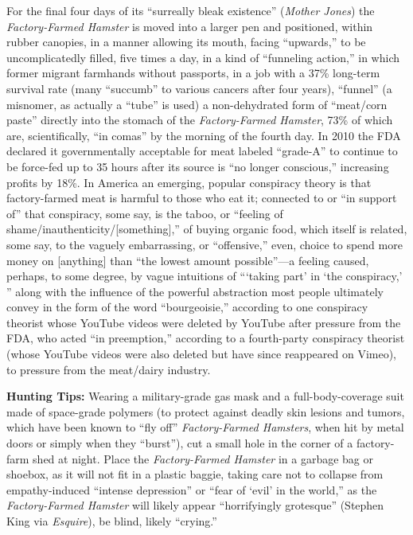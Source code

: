 \documentclass[10pt,twoside,openright]{memoir}
\begin{document}
For the final four days of its ``surreally
bleak existence'' ({\em Mother Jones}) the {\em Factory-Farmed Hamster} is moved
into a larger pen and positioned, within rubber canopies, in a manner allowing
its mouth, facing ``upwards,'' to be uncomplicatedly filled, five times a
day, in a kind of ``funneling action,'' in which former migrant farmhands
without passports, in a job with a 37\% long-term survival rate (many ``succumb''
to various cancers after four years), ``funnel'' (a misnomer, as actually a
``tube'' is used) a non-dehydrated form of ``meat/corn paste'' directly into the
stomach of the {\em Factory-Farmed Hamster}, 73\% of which are, scientifically,
``in comas'' by the morning of the fourth day. In 2010 the FDA declared it
governmentally acceptable for meat labeled ``grade-A'' to continue to be
force-fed up to 35 hours after its source is ``no longer conscious,'' increasing
profits by 18\%. In America an emerging, popular conspiracy theory is that
factory-farmed meat is harmful to those who eat it; connected to or ``in support
of'' that conspiracy, some say, is the taboo, or ``feeling of
shame/inauthenticity/[something],'' of buying organic food, which itself is
related, some say, to the vaguely embarrassing, or ``offensive,'' even, choice
to spend more money on [anything] than ``the lowest amount possible''---a
feeling caused, perhaps, to some degree, by vague intuitions of ```taking part'
in `the conspiracy,' '' along with the influence of the powerful abstraction
most people ultimately convey in the form of the word ``bourgeoisie,'' according
to one conspiracy theorist whose YouTube videos were deleted by YouTube after
pressure from the FDA, who acted ``in preemption,'' according to a fourth-party
conspiracy theorist (whose YouTube videos were also deleted but have since
reappeared on Vimeo), to pressure from the meat/dairy industry.

\noindent
\textbf{Hunting Tips:} Wearing a military-grade gas mask and a
full-body-coverage suit made of space-grade polymers (to protect against deadly
skin lesions and tumors, which have been known to ``fly off'' {\em
Factory-Farmed Hamsters}, when hit by metal doors or simply when they
``burst''), cut a small hole in the corner of a factory-farm shed at night.
Place the {\em Factory-Farmed Hamster} in a garbage bag or shoebox, as it will
not fit in a plastic baggie, taking care not to collapse from empathy-induced
``intense depression'' or ``fear of `evil' in the world,'' as the {\em
Factory-Farmed Hamster} will likely appear ``horrifyingly grotesque'' (Stephen
King via {\em Esquire}), be blind, likely ``crying.''
\end{document}

